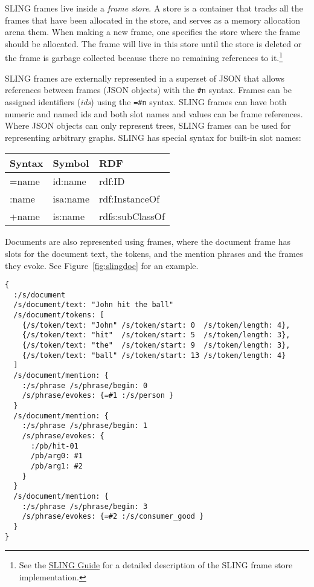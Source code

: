 \documentclass[11pt,a4paper]{article}
\begin{document}
SLING frames live inside a \emph{frame store}. A store is a container that
tracks all the frames that have been allocated in the store, and serves as a
memory allocation arena them. When making a new frame, one
specifies the store where the frame should be allocated. The frame will live in
this store until the store is deleted or the frame is garbage collected because
there no remaining references to it.\footnote{See the \href{https://github.com/google/sling/blob/master/frame/README.md}{SLING Guide}
for a detailed description of the SLING frame store implementation.}

SLING frames are externally represented in a superset of JSON that allows references
between frames (JSON objects) with the {\tt \#n} syntax. Frames can be
assigned identifiers (\emph{ids}) using the {\tt=\#n} syntax. SLING frames can have both numeric and
named ids and both slot names and values can be frame references. Where JSON
objects can only represent trees, SLING frames can be used for representing
arbitrary graphs. SLING has special syntax for built-in slot names:

\begin{table}[h!]
\begin{tabular}{|l|l|l|}
\hline
Syntax & Symbol & RDF \\
\hline
=name & id:name & rdf:ID \\
:name & isa:name & rdf:InstanceOf \\
+name & is:name & rdfs:subClassOf \\
\hline
\end{tabular}
\end{table}

Documents are also represented using frames, where the document frame has slots
for the document text, the tokens, and the mention phrases and the frames they
evoke. See Figure~\ref{fig:slingdoc} for an example.

\begin{figure*}[t]
  \begin{verbatim}
{
  :/s/document
  /s/document/text: "John hit the ball"
  /s/document/tokens: [
    {/s/token/text: "John" /s/token/start: 0  /s/token/length: 4},
    {/s/token/text: "hit"  /s/token/start: 5  /s/token/length: 3},
    {/s/token/text: "the"  /s/token/start: 9  /s/token/length: 3},
    {/s/token/text: "ball" /s/token/start: 13 /s/token/length: 4}
  ]
  /s/document/mention: {
    :/s/phrase /s/phrase/begin: 0
    /s/phrase/evokes: {=#1 :/s/person }
  }
  /s/document/mention: {
    :/s/phrase /s/phrase/begin: 1
    /s/phrase/evokes: {
      :/pb/hit-01
      /pb/arg0: #1
      /pb/arg1: #2
    }
  }
  /s/document/mention: {
    :/s/phrase /s/phrase/begin: 3
    /s/phrase/evokes: {=#2 :/s/consumer_good }
  }
}
\end{verbatim}
  \caption{The text ``John hit the ball" in SLING frame notation. The document
  itself is represented by a frame that has the text, an array of tokens and
  the mentions that evoke frames. There are three frames: a person frame (John),
  a consumer good frame (bat) and a hit-01 frame. The hit frame has the person
  frame as the agent (arg0) and the ball frame as the object (arg1).}
  \label{fig:slingdoc}
\end{figure*}
\end{document}
